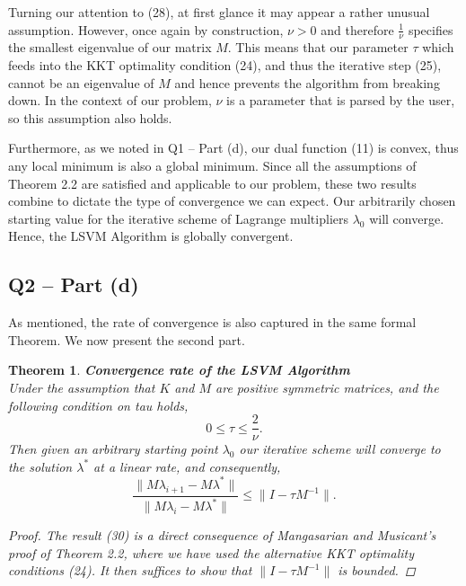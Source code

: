 \documentclass{article}
\newtheorem{theorem}{Theorem}[section]
\begin{document}
Turning our attention to (28), at first glance it may appear a rather unusual assumption. However, once again by construction, $\nu > 0$ and therefore $\frac{1}{\nu}$ specifies the smallest eigenvalue of our matrix $M$. This means that our parameter $\tau$ which feeds into the KKT optimality condition (24), and thus the iterative step (25), cannot be an eigenvalue of $M$ and hence prevents the algorithm from breaking down. In the context of our problem, $\nu$ is a parameter that is parsed by the user, so this assumption also holds. \par

Furthermore, as we noted in Q1 – Part (d), our dual function (11) is convex, thus any local minimum is also a global minimum. Since all the assumptions of Theorem 2.2 are satisfied and applicable to our problem, these two results combine to dictate the type of convergence we can expect. Our arbitrarily chosen starting value for the iterative scheme of Lagrange multipliers $\lambda_{0}$ will converge. Hence, the LSVM Algorithm is globally convergent.

\subsection*{Q2 – Part (d)}
As mentioned, the rate of convergence is also captured in the same formal Theorem. We now present the second part.
\begin{theorem} \textbf{Convergence \textit{rate} of the LSVM Algorithm} \cite{mangasarian2001lagrangian} \\
Under the assumption that $K$ and $M$ are positive symmetric matrices, and the following condition on tau holds,
\begin{equation}
    0 \leq \tau \leq \frac{2}{\nu}.
\end{equation}
Then given an arbitrary starting point $\lambda_{0}$ our iterative scheme will converge to the solution $\lambda^{*}$ at a linear rate, and consequently,
\begin{equation}
    \frac{\|M \lambda_{i+1} - M \lambda^{*} \|}{\|M \lambda_{i} - M \lambda^{*} \|} \leq \| I - \tau M^{-1} \|.
\end{equation}
\begin{proof}
The result (30) is a direct consequence of Mangasarian and Musicant's proof of Theorem 2.2, where we have used the alternative KKT optimality conditions (24). It then suffices to show that $\| I -\tau M^{-1} \|$ is bounded.
\end{proof}
\end{theorem}
\end{document}

